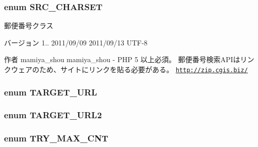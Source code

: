 \label{zip_2_zip_8php_a6338036fb4a9625bc327d7ae3bdcf14c}
\hypertarget{zip_2_zip_8php_a6917e80f882a8e319e4d9760052bc8c4}{
\subsubsection[{\-S\-R\-C\-\_\-\-C\-H\-A\-R\-S\-E\-T}]{\setlength{\rightskip}{0pt plus 5cm}enum {\bf \-S\-R\-C\-\_\-\-C\-H\-A\-R\-S\-E\-T}}}
\label{zip_2_zip_8php_a6917e80f882a8e319e4d9760052bc8c4}
郵便番号クラス

\begin{DoxyVersion}{バージョン}
1..  2011/09/09  2011/09/13  \-U\-T\-F-\/8 
\end{DoxyVersion}
\begin{DoxyAuthor}{作者}
mamiya\-\_\-shou  mamiya\-\_\-shou  -\/  \-P\-H\-P 5 以上必須。 郵便番号検索\-A\-P\-Iはリンクウェアのため、サイトにリンクを貼る必要がある。  \href{http://zip.cgis.biz/}{\tt http\-://zip.\-cgis.\-biz/} 
\end{DoxyAuthor}
\hypertarget{zip_2_zip_8php_afaddb223f179f9ebd0384c0d6990f523}{
\subsubsection[{\-T\-A\-R\-G\-E\-T\-\_\-\-U\-R\-L}]{\setlength{\rightskip}{0pt plus 5cm}enum {\bf \-T\-A\-R\-G\-E\-T\-\_\-\-U\-R\-L}}}
\label{zip_2_zip_8php_afaddb223f179f9ebd0384c0d6990f523}
\hypertarget{zip_2_zip_8php_a686232aba27a57aa5b547b11d7522f93}{
\subsubsection[{\-T\-A\-R\-G\-E\-T\-\_\-\-U\-R\-L2}]{\setlength{\rightskip}{0pt plus 5cm}enum {\bf \-T\-A\-R\-G\-E\-T\-\_\-\-U\-R\-L2}}}
\label{zip_2_zip_8php_a686232aba27a57aa5b547b11d7522f93}
\hypertarget{zip_2_zip_8php_a7871ccb17e3f226c23a9059aae2b4be0}{
\subsubsection[{\-T\-R\-Y\-\_\-\-M\-A\-X\-\_\-\-C\-N\-T}]{\setlength{\rightskip}{0pt plus 5cm}enum {\bf \-T\-R\-Y\-\_\-\-M\-A\-X\-\_\-\-C\-N\-T}}}
\label{zip_2_zip_8php_a7871ccb17e3f226c23a9059aae2b4be0}
